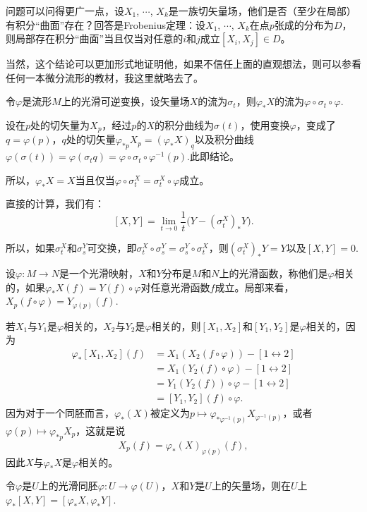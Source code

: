 \para 问题可以问得更广一点，设$X_1$, $\cdots$, $X_k$是一族切矢量场，他们是否（至少在局部）有积分“曲面”存在？回答是Frobenius定理：设$X_1$, $\cdots$, $X_k$在点$p$张成的分布为$D$，则局部存在积分“曲面”当且仅当对任意的$i$和$j$成立$[X_i,X_j]\in D$。

当然，这个结论可以更加形式地证明他，如果不信任上面的直观想法，则可以参看任何一本微分流形的教材，我这里就略去了。


\para 令$\varphi$是流形$M$上的光滑可逆变换，设矢量场$X$的流为$\sigma_t$，则$\varphi_*X$的流为$\varphi\circ \sigma_t\circ\varphi$.

设在$p$处的切矢量为$X_p$，经过$p$的$X$的积分曲线为$\sigma(t)$，使用变换$\varphi$，变成了$q=\varphi(p)$，$q$处的切矢量$\varphi_{*p}X_p=(\varphi_*X)_q$以及积分曲线$\varphi(\sigma(t))=\varphi(\sigma_t q)=\varphi\circ\sigma_t\circ \varphi^{-1}(p)$.此即结论。

\para 所以，$\varphi_*X=X$当且仅当$\varphi\circ \sigma^X_t=\sigma^X_t\circ \varphi$成立。

\para 直接的计算，我们有：
	\[
		[X,Y]=\lim_{t\to 0}\frac{1}{t}\bigl(Y-(\sigma_t^X)_*Y\bigr).
	\]

所以，如果$\sigma_t^X$和$\sigma_s^Y$可交换，即$\sigma_t^X\circ \sigma_s^Y=\sigma_s^Y\circ \sigma_t^X$，则$(\sigma_t^X)_*Y=Y$以及$[X,Y]=0$.

设$\varphi:M\to N$是一个光滑映射，$X$和$Y$分布是$M$和$N$上的光滑函数，称他们是$\varphi$相关的，如果$\varphi_*X(f)=Y(f)\circ \varphi$对任意光滑函数$f$成立。局部来看，$X_p(f\circ \varphi)=Y_{\varphi(p)}(f)$.

若$X_1$与$Y_1$是$\varphi$相关的，$X_2$与$Y_2$是$\varphi$相关的，则$[X_1,X_2]$和$[Y_1,Y_2]$是$\varphi$相关的，因为
\begin{align*}
	\varphi_*[X_1,X_2](f)&=X_1(X_2(f\circ \varphi))-[1\leftrightarrow 2]\\
	&=X_1(Y_2(f)\circ\varphi)-[1\leftrightarrow 2]\\
	&=Y_1(Y_2(f))\circ \varphi-[1\leftrightarrow 2]\\
	&=[Y_1,Y_2](f)\circ \varphi.
\end{align*}
因为对于一个同胚而言，$\varphi_*(X)$被定义为$p\mapsto \varphi_{*\varphi^{-1}(p)}X_{\varphi^{-1}(p)}$，或者$\varphi(p)\mapsto \varphi_{*p}X_p$，这就是说
\[
	X_p(f)=\varphi_*(X)_{\varphi(p)}(f),
\]
因此$X$与$\varphi_*X$是$\varphi$相关的。


\para 令$\varphi$是$U$上的光滑同胚$\varphi:U\to \varphi(U)$，$X$和$Y$是$U$上的矢量场，则在$U$上$\varphi_{*}[X,Y]=[\varphi_{*}X,\varphi_{*}Y]$.

